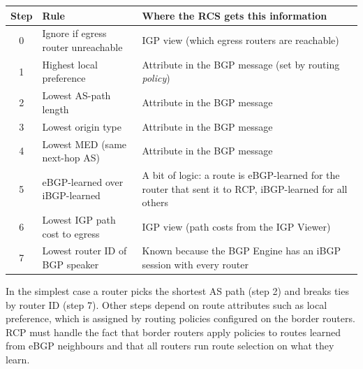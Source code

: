 \begin{center}
\begin{tabularx}{\linewidth}{@{}c l X@{}}
\toprule
\textbf{Step} & \textbf{Rule} & \textbf{Where the RCS gets this information} \\
\midrule
0 & Ignore if egress router unreachable & IGP view (which egress routers are reachable) \\
1 & Highest local preference & Attribute in the BGP message (set by routing \emph{policy}) \\
2 & Lowest AS-path length & Attribute in the BGP message \\
3 & Lowest origin type & Attribute in the BGP message \\
4 & Lowest MED (same next-hop AS) & Attribute in the BGP message \\
5 & eBGP-learned over iBGP-learned & A bit of logic: a route is eBGP-learned for the router that sent it to RCP, iBGP-learned for all others \\
6 & Lowest IGP path cost to egress & IGP view (path costs from the IGP Viewer) \\
7 & Lowest router ID of BGP speaker & Known because the BGP Engine has an iBGP session with every router \\
\bottomrule
\end{tabularx}
\end{center}
In the simplest case a router picks the shortest AS path (step 2) and breaks ties by router ID (step 7). Other steps depend on route attributes such as local preference, which is assigned by routing policies configured on the border routers. RCP must handle the fact that border routers apply policies to routes learned from eBGP neighbours and that all routers run route selection on what they learn.

